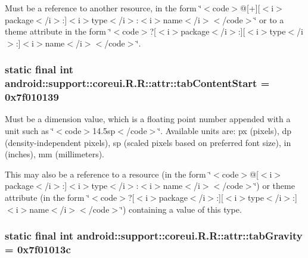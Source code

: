 Must be a reference to another resource, in the form \char`\"{}$<$code$>$@\mbox{[}+\mbox{]}\mbox{[}$<$i$>$package$<$/i$>$:\mbox{]}$<$i$>$type$<$/i$>$:$<$i$>$name$<$/i$>$$<$/code$>$\char`\"{} or to a theme attribute in the form \char`\"{}$<$code$>$?\mbox{[}$<$i$>$package$<$/i$>$:\mbox{]}\mbox{[}$<$i$>$type$<$/i$>$:\mbox{]}$<$i$>$name$<$/i$>$$<$/code$>$\char`\"{}. \hypertarget{classandroid_1_1support_1_1coreui_1_1_r_1_1attr_7965651feb469f971b38ab9700b127fe}{
\subsubsection[{tabContentStart}]{\setlength{\rightskip}{0pt plus 5cm}static final int android::support::coreui.R.R::attr::tabContentStart = 0x7f010139}}
\label{classandroid_1_1support_1_1coreui_1_1_r_1_1attr_7965651feb469f971b38ab9700b127fe}


Must be a dimension value, which is a floating point number appended with a unit such as \char`\"{}$<$code$>$14.5sp$<$/code$>$\char`\"{}. Available units are: px (pixels), dp (density-independent pixels), sp (scaled pixels based on preferred font size), in (inches), mm (millimeters). 

This may also be a reference to a resource (in the form \char`\"{}$<$code$>$@\mbox{[}$<$i$>$package$<$/i$>$:\mbox{]}$<$i$>$type$<$/i$>$:$<$i$>$name$<$/i$>$$<$/code$>$\char`\"{}) or theme attribute (in the form \char`\"{}$<$code$>$?\mbox{[}$<$i$>$package$<$/i$>$:\mbox{]}\mbox{[}$<$i$>$type$<$/i$>$:\mbox{]}$<$i$>$name$<$/i$>$$<$/code$>$\char`\"{}) containing a value of this type. \hypertarget{classandroid_1_1support_1_1coreui_1_1_r_1_1attr_7d68aa1650fd2cf848719efc612e0043}{
\subsubsection[{tabGravity}]{\setlength{\rightskip}{0pt plus 5cm}static final int android::support::coreui.R.R::attr::tabGravity = 0x7f01013c}}
\label{classandroid_1_1support_1_1coreui_1_1_r_1_1attr_7d68aa1650fd2cf848719efc612e0043}


